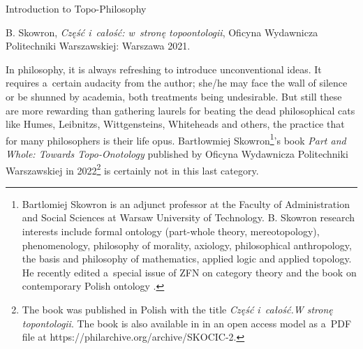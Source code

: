 





Introduction to Topo-Philosophy





B. Skowron, \textit{Część i~całość: w~stronę topoontologii}, Oficyna Wydawnicza Politechniki Warszawskiej: Warszawa 2021.



In philosophy, it is always refreshing to introduce unconventional ideas. It requires a~certain audacity from the author; she/he may face the wall of silence or be shunned by academia, both treatments being undesirable. But still these are more rewarding than gathering laurels for beating the dead philosophical cats like Humes, Leibnitzs, Wittgensteins, Whiteheads and others, the practice that for many philosophers is their life opus. Bartłowmiej Skowron\footnote{Bartlomiej Skowron is an adjunct professor at the Faculty of Administration and Social Sciences at Warsaw University of Technology. B. Skowron research interests include formal ontology (part-whole theory, mereotopology), phenomenology, philosophy of morality, axiology, philosophical anthropology, the basis and philosophy of mathematics, applied logic and applied topology. He recently edited a~special issue of ZFN on category theory 
\parencite[see editorial note][]{eckstein_is_2020} %
 and the book on contemporary Polish ontology 
\parencites[][]{skowron_contemporary_2020}[reviewed by][]{krzanowski_contemporary_2020}.%
}'s book \textit{Part and Whole: Towards Topo-Onotology} published by Oficyna Wydawnicza Politechniki Warszawskiej in 2022\footnote{The book was published in Polish with the title \textit{Część i~całość.W stronę topontologii}. The book is also available in in an open access model as a~PDF file at https://philarchive.org/archive/SKOCIC-2.} is certainly not in this last category.




